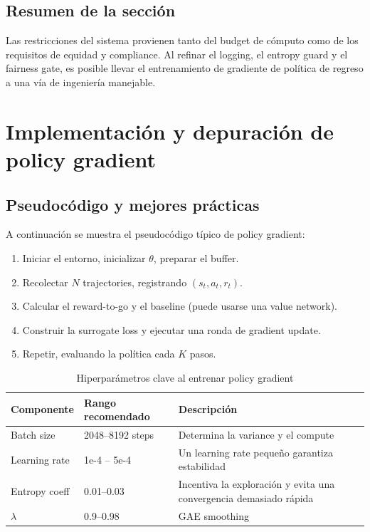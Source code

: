\documentclass[a4paper]{article}
\begin{document}
\subsection{Resumen de la sección}
Las restricciones del sistema provienen tanto del budget de cómputo como de los requisitos de equidad y compliance. Al refinar el logging, el entropy guard y el fairness gate, es posible llevar el entrenamiento de gradiente de política de regreso a una vía de ingeniería manejable.

\section{Implementación y depuración de policy gradient}
\subsection{Pseudocódigo y mejores prácticas}
A continuación se muestra el pseudocódigo típico de policy gradient:
\begin{enumerate}
    \item Iniciar el entorno, inicializar $\theta$, preparar el buffer.
    \item Recolectar $N$ trajectories, registrando $(s_t,a_t,r_t)$.
    \item Calcular el reward-to-go y el baseline (puede usarse una value network).
    \item Construir la surrogate loss y ejecutar una ronda de gradient update.
    \item Repetir, evaluando la política cada $K$ pasos.
\end{enumerate}

\begin{table}[H]
\centering
\small
\begin{tabular}{p{}p{}p{}}
\toprule
Componente & Rango recomendado & Descripción \\
\midrule
Batch size & 2048--8192 steps & Determina la variance y el compute \\
Learning rate & 1e-4 -- 5e-4 & Un learning rate pequeño garantiza estabilidad \\
Entropy coeff & 0.01--0.03 & Incentiva la exploración y evita una convergencia demasiado rápida \\
$\lambda$ & 0.9--0.98 & GAE smoothing \\
\bottomrule
\end{tabular}
\caption{Hiperparámetros clave al entrenar policy gradient}
\end{table}
\end{document}
